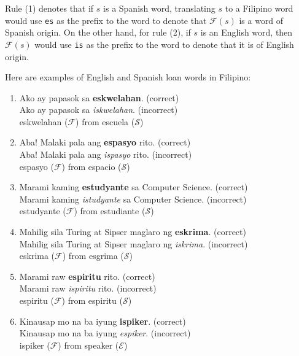 Rule (1) denotes that if \(s\) is a Spanish word, translating \(s\) to a Filipino
word would use \texttt{es} as the prefix to the word to denote that \(\mathcal{F}(s)\)
is a word of Spanish origin. On the other hand, for rule (2), if \(s\) is an
English word, then \(\mathcal{F}(s)\) would use \texttt{is} as the prefix to the word
to denote that it is of English origin.

\begin{example}
      Here are examples of English and Spanish loan words in Filipino:
\end{example}
\begin{enumerate}
      \item Ako ay papasok sa \textbf{eskwelahan}. (correct) \\
            Ako ay papasok sa \textit{iskwelahan}. (incorrect) \\
            eskwelahan (\(\mathcal{F}\)) from escuela (\(\mathcal{S}\))
      \item Aba! Malaki pala ang \textbf{espasyo} rito. (correct) \\
            Aba! Malaki pala ang \textit{ispasyo} rito. (incorrect) \\
            espasyo (\(\mathcal{F}\)) from espacio (\(\mathcal{S}\))
      \item Marami kaming \textbf{estudyante} sa Computer Science. (correct) \\
            Marami kaming \textit{istudyante} sa Computer Science. (incorrect)\\
            estudyante (\(\mathcal{F}\)) from estudiante (\(\mathcal{S}\))
      \item Mahilig sila Turing at Sipser maglaro ng \textbf{eskrima}. (correct) \\
            Mahilig sila Turing at Sipser maglaro ng \textit{iskrima}. (incorrect) \\
            eskrima  (\(\mathcal{F}\)) from esgrima (\(\mathcal{S}\))
      \item Marami raw \textbf{espiritu} rito. (correct) \\
            Marami raw \textit{ispiritu} rito. (incorrect) \\
            espiritu (\(\mathcal{F}\)) from espiritu (\(\mathcal{S}\))
      \item Kinausap mo na ba iyung \textbf{ispiker}. (correct) \\
            Kinausap mo na ba iyung \textit{espiker}. (incorrect) \\
            ispiker (\(\mathcal{F}\)) from speaker (\(\mathcal{E}\))

\end{enumerate}
